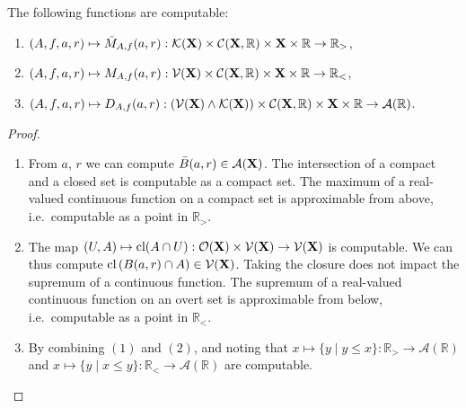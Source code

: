 \documentclass{eptcs-modified}
\begin{document}
\begin{lemma}
\label{lem:mmd}
The following functions are computable:
\begin{enumerate}
\item $(A,f,a,r) \mapsto \bar{M}_{A,f}(a,r) : \mathcal{K}(\mathbf{X}) \times \mathcal{C}(\mathbf{X},\mathbb{R}) \times \mathbf{X} \times \mathbb{R} \to \mathbb{R}_>$,
\item $(A,f,a,r) \mapsto M_{A,f}(a,r) : \mathcal{V}(\mathbf{X}) \times \mathcal{C}(\mathbf{X},\mathbb{R}) \times \mathbf{X} \times \mathbb{R} \to \mathbb{R}_<$,
\item $(A,f,a,r) \mapsto D_{A,f}(a, r) : (\mathcal{V}(\mathbf{X}) \wedge \mathcal{K}(\mathbf{X}))  \times \mathcal{C}(\mathbf{X},\mathbb{R}) \times \mathbf{X} \times \mathbb{R} \to \mathcal{A}(\mathbb{R})$.
\end{enumerate}
\begin{proof}
\begin{enumerate}
\item From $a$, $r$ we can compute $\bar{B}(a,r) \in \mathcal{A}(\mathbf{X})$. The intersection of a compact and a closed set is computable as a compact set. The maximum of a real-valued continuous function on a compact set is approximable from above, i.e.~computable as a point in $\mathbb{R}_>$.
\item The map $(U, A) \mapsto \textrm{cl} (A \cap U) : \mathcal{O}(\mathbf{X}) \times \mathcal{V}(\mathbf{X}) \to \mathcal{V}(\mathbf{X})$ is computable. We can thus compute $\textrm{cl}\,  (B(a, r) \cap A) \in \mathcal{V}(\mathbf{X})$. Taking the closure does not impact the supremum of a continuous function. The supremum of a real-valued continuous function on an overt set is approximable from below, i.e.~computable as a point in $\mathbb{R}_<$.
\item By combining $(1)$ and $(2)$, and noting that $x \mapsto \{y \mid y \leq x\} : \mathbb{R}_> \to \mathcal{A}(\mathbb{R})$ and $x \mapsto \{y \mid x \leq y\} : \mathbb{R}_< \to \mathcal{A}(\mathbb{R})$ are computable.
\end{enumerate}
\end{proof}
\end{lemma}
\end{document}
